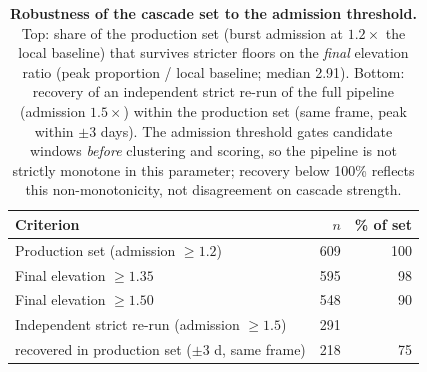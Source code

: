 \begin{table}[H]
\centering
\renewcommand{\arraystretch}{1.15}
\caption{\textbf{Robustness of the cascade set to the admission threshold.}
Top: share of the production set (burst admission at $1.2\times$ the local
baseline) that survives stricter floors on the \emph{final} elevation ratio
(peak proportion / local baseline; median 2.91). Bottom: recovery of an
independent strict re-run of the full pipeline (admission $1.5\times$)
within the production set (same frame, peak within $\pm 3$ days). The
admission threshold gates candidate windows \emph{before} clustering and
scoring, so the pipeline is not strictly monotone in this parameter;
recovery below 100\% reflects this non-monotonicity, not disagreement on
cascade strength.}
\label{tab:si_sensitivity}
\vspace{0.3em}
\small
\begin{tabular}{@{}l r r@{}}
\toprule
Criterion & $n$ & \% of set \\
\midrule
Production set (admission $\geq 1.2$) & 609 & 100 \\
Final elevation $\geq 1.35$ & 595 & 98 \\
Final elevation $\geq 1.50$ & 548 & 90 \\
\midrule
Independent strict re-run (admission $\geq 1.5$) & 291 & \\
\quad recovered in production set ($\pm 3$ d, same frame) & 218 & 75 \\
\bottomrule
\end{tabular}
\end{table}
